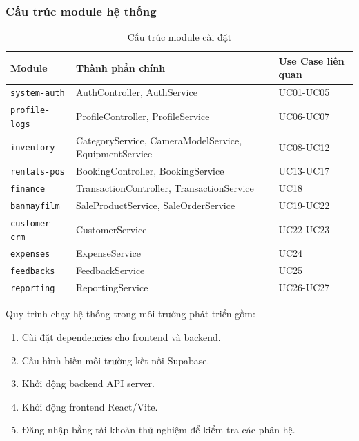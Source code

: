 \subsubsection{Cấu trúc module hệ thống}

\begin{table}[H]
	\centering
	\caption{Cấu trúc module cài đặt}
	\begin{tabularx}{\textwidth}{|l|l|X|}
		\hline
		\textbf{Module} & \textbf{Thành phần chính} & \textbf{Use Case liên quan} \\
		\hline
		\texttt{system-auth} & AuthController, AuthService & UC01-UC05 \\
		\hline
		\texttt{profile-logs} & ProfileController, ProfileService & UC06-UC07 \\
		\hline
		\texttt{inventory} & CategoryService, CameraModelService, EquipmentService & UC08-UC12 \\
		\hline
		\texttt{rentals-pos} & BookingController, BookingService & UC13-UC17 \\
		\hline
		\texttt{finance} & TransactionController, TransactionService & UC18 \\
		\hline
		\texttt{banmayfilm} & SaleProductService, SaleOrderService & UC19-UC22 \\
		\hline
		\texttt{customer-crm} & CustomerService & UC22-UC23 \\
		\hline
		\texttt{expenses} & ExpenseService & UC24 \\
		\hline
		\texttt{feedbacks} & FeedbackService & UC25 \\
		\hline
		\texttt{reporting} & ReportingService & UC26-UC27 \\
		\hline
	\end{tabularx}
\end{table}

Quy trình chạy hệ thống trong môi trường phát triển gồm:
\begin{enumerate}
    \item Cài đặt dependencies cho frontend và backend.
    \item Cấu hình biến môi trường kết nối Supabase.
    \item Khởi động backend API server.
    \item Khởi động frontend React/Vite.
    \item Đăng nhập bằng tài khoản thử nghiệm để kiểm tra các phân hệ.
\end{enumerate}

